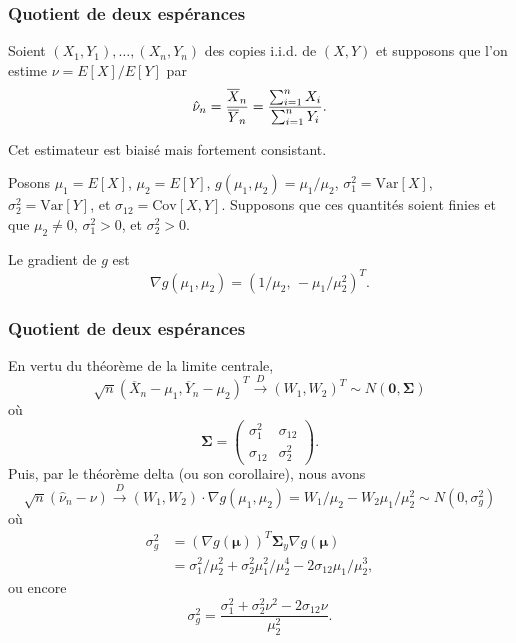 \documentclass[t,usepdftitle=false]{beamer}
\def\bmu{\boldsymbol{\mu}}
\def\bSigma{\boldsymbol{\Sigma}}
\def\bzero{\boldsymbol{0}}
\def\Var{\mbox{Var}}
\def\Cov{\mbox{Cov}}
\def\iid{i.i.d.}
\def\To{\overset{D}{\to}}
\begin{document}
\begin{frame}
\frametitle{Quotient de deux espérances}

Soient $(X_1,Y_1),\dots,(X_n,Y_n)$ des copies \iid{} de ${(X,Y)}$
et supposons que l'on estime ${\nu} = E[X]/E[Y]$ par
$$
  {\hat\nu_n} = {\overline{X}_n \over \overline{Y}_n}
                  = {\sum_{i=1}^n X_i \over \sum_{i=1}^n Y_i}.
$$

\mbox{}

Cet estimateur est biaisé mais fortement consistant.

\mbox{}

Posons ${\mu_1} = E[X]$, ${\mu_2} = E[Y]$, 
${g}(\mu_1,\mu_2) = \mu_1/\mu_2$,
${\sigma_1^2} = \Var[X]$,
${\sigma_2^2} = \Var[Y]$, et
${\sigma_{12}} = \Cov[X, Y]$.
Supposons que ces quantités soient finies et que
$\mu_2\not=0$, $\sigma_1^2 > 0$, et $\sigma_2^2 > 0$.

\mbox{}

Le gradient de $g$ est
\[
{\nabla g(\mu_1,\mu_2)} = (1/\mu_2,\, -\mu_1/\mu_2^2)^T.
\]

\end{frame}

\begin{frame}
\frametitle{Quotient de deux espérances}

En vertu du théorème de la limite centrale,
\[
  \sqrt{n} (\overline{X}_n-\mu_1, \overline{Y}_n-\mu_2)^T
    \To ({W_1}, {W_2})^T 
   \sim N(\bzero,\bSigma)
\]
où
\[
  \bSigma =
  \begin{pmatrix}
    \sigma_1^2 & \sigma_{12} \\
    \sigma_{12} & \sigma_2^2
  \end{pmatrix}.
\]
Puis, par le théorème delta (ou son corollaire), nous avons
\[
  \sqrt{n}(\hat\nu_n-\nu) \To (W_1, W_2)\cdot \nabla g(\mu_1,\mu_2) 
   = W_1/\mu_2 - W_2 \mu_1/\mu_2^2
   \sim N(0,\sigma_g^2)
\]
où
\begin{align*}
 {\sigma_g^2}
            & = (\nabla g(\bmu))^T\bSigma_y\nabla g(\bmu) \\
            & = \sigma_1^2/\mu_2^2 + \sigma_{2}^2 \mu_1^2/\mu_2^4 
                - 2 \sigma_{12} \mu_1/\mu_2^3,
\end{align*}
ou encore
\[
 {\sigma_g^2} = \frac{\sigma_1^2 + \sigma_{2}^2 \nu^2 - 2 \sigma_{12} \nu}{\mu_2^2}.
\]

\end{frame}
\end{document}
